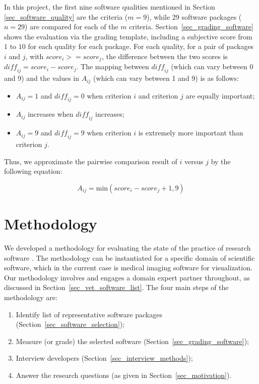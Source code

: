 \documentclass[final, 3p, times, authoryear]{elsarticle}
\begin{document}
In this project, the first nine software qualities mentioned in Section
\ref{sec_software_quality} are the criteria ($m = 9$), while 29 software
packages ($n = 29$) are compared for each of the $m$ criteria.
Section~\ref{sec_grading_software} shows the evaluation via the grading
template, including a subjective score from $1$ to $10$ for each quality for
each package. For each quality, for a pair of packages $i$ and $j$, with
$\mathit{score}_i >= \mathit{score}_j$, the difference between the two scores is
$\mathit{diff_{ij}} = \mathit{score}_i - \mathit{score}_j$. The mapping between
$\mathit{diff_{ij}}$ (which can vary between 0 and 9) and the values in $A_{ij}$
(which can vary between 1 and 9) is as follows:

\begin{itemize}
\item $A_{ij} = 1$ and $\mathit{diff_{ij}} = 0$ when criterion $i$ and criterion
$j$ are equally important;
\item $A_{ij}$ increases when $\mathit{diff_{ij}}$ increases;
\item $A_{ij} = 9$ and $\mathit{diff_{ij}} = 9$ when criterion $i$ is extremely
more important than criterion $j$.
\end{itemize}

\noindent Thus, we approximate the pairwise comparison result of $i$ versus $j$
by the following equation:

\begin{equation}
A_{ij} = \text{min}(\mathit{score}_i - \mathit{score}_j + 1, 9)
\end{equation}

\section{Methodology} \label{ch_methods}

We developed a methodology for evaluating the state of the practice of research
software \citep{SmithEtAl2021, SmithAndMichalski2022}.  The methodology can be
instantiated for a specific domain of scientific software, which in the current
case is medical imaging software for visualization.  Our methodology involves
and engages a domain expert partner throughout, as discussed in
Section~\ref{sec_vet_software_list}.  The four main steps of the methodology
are:

\begin{enumerate}
\item Identify list of representative software packages
(Section~\ref{sec_software_selection});
\item Measure (or grade) the selected software
(Section~\ref{sec_grading_software});
\item Interview developers (Section~\ref{sec_interview_methods});
\item Answer the research questions (as given in Section~\ref{sec_motivation}).
\end{enumerate}
\end{document}
